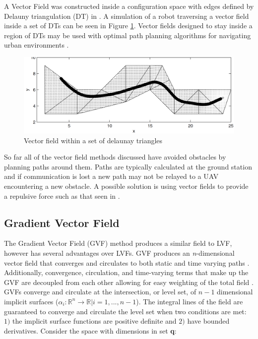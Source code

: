 \documentclass[numbered,pdftex]{ohio-etd}
\begin{document}
A Vector Field was constructed inside a configuration space with edges defined by Delauny triangulation (DT) in \cite{pimenta_fully_2007}.  A simulation of a robot traversing a vector field inside a set of DTs can be seen in Figure \ref{fig:cdtVF}. Vector fields designed to stay inside a region of DTs may be used with optimal path planning algorithms for navigating urban environments \cite{md_simplex_2017}.


\begin{figure}
	\centering
	\includegraphics[width=15cm]{PaperFigures/cdtVF}
	\caption{Vector field within a set of delaunay triangles \cite{pimenta_fully_2007}}
	\label{fig:cdtVF}
\end{figure}

So far all of the vector field methods discussed have avoided obstacles by planning paths around them. Paths are typically calculated at the ground station and if communication is lost a new path may not be relayed to a UAV encountering a new obstacle. A possible solution is using vector fields to provide a repulsive force such as that seen in \cite{zhou_vector_2014,panagou_motion_2014,wwc}.


\subsection{Gradient Vector Field}
The Gradient Vector Field (GVF) method produces a similar field to LVF, however has several advantages over LVFs. GVF produces an \textit{n}-dimensional vector field that converges and circulates to both static and time varying paths \cite{goncalves_artificial_2009}. Additionally, convergence, circulation, and time-varying terms that make up the GVF are decoupled from each other allowing for easy weighting of the total field \cite{goncalves_circulation_2010}. GVFs converge and circulate at the intersection, or level set, of $n-1$ dimensional implicit surfaces ($\alpha_i:\mathbb{R}^n\rightarrow\mathbb{R} | i=1,...,n-1$). The integral lines of the field are guaranteed to converge and circulate the level set when two conditions are met: $1)$ the implicit surface functions are positive definite and $2)$ have bounded derivatives. Consider the space with dimensions in set \textbf{q}:
\end{document}
